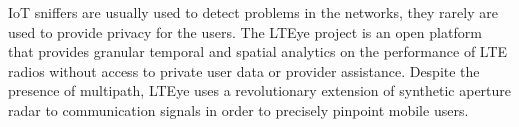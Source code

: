 \documentclass[conference]{IEEEtran}
\begin{document}
IoT sniffers are usually used to detect problems in the networks, they rarely
are used to provide privacy for the users.
The LTEye project \cite{KumarLTE} is an open platform that provides
granular temporal and spatial analytics on the performance of LTE radios without
access to private user data or provider assistance. Despite the presence of multipath,
LTEye uses a revolutionary extension of synthetic aperture radar to communication
signals in order to precisely pinpoint mobile users.











\end{document}
